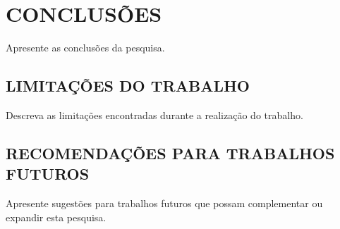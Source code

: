 \chapter{CONCLUSÕES}
\label{conclusao}

Apresente as conclusões da pesquisa.

\section{LIMITAÇÕES DO TRABALHO}

Descreva as limitações encontradas durante a realização do trabalho.

\section{RECOMENDAÇÕES PARA TRABALHOS FUTUROS}

Apresente sugestões para trabalhos futuros que possam complementar ou expandir esta pesquisa.
